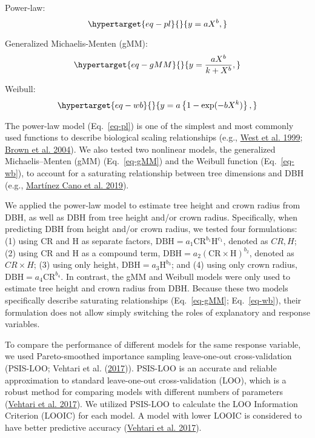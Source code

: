 \documentclass[
  12pt,
  letterpaper,
  DIV=11,
  numbers=noendperiod]{scrartcl}
\begin{document}
Power-law: \begin{equation}\protect\hypertarget{eq-pl}{}{
y = aX^b,
}\label{eq-pl}\end{equation}

Generalized Michaelis-Menten (gMM):
\begin{equation}\protect\hypertarget{eq-gMM}{}{
y = \frac{aX^b}{k + X^b},
}\label{eq-gMM}\end{equation}

Weibull: \begin{equation}\protect\hypertarget{eq-wb}{}{
y = a\left\{1-\mathrm{exp}(-bX^k)\right\},
}\label{eq-wb}\end{equation}

The power-law model (Eq.~\ref{eq-pl}) is one of the simplest and most
commonly used functions to describe biological scaling relationships
(e.g., \protect\hyperlink{ref-West1999}{West et al. 1999};
\protect\hyperlink{ref-Brown2004}{Brown et al. 2004}). We also tested
two nonlinear models, the generalized Michaelis--Menten (gMM)
(Eq.~\ref{eq-gMM}) and the Weibull function (Eq.~\ref{eq-wb}), to
account for a saturating relationship between tree dimensions and DBH
(e.g., \protect\hyperlink{ref-MartinezCano2019}{Martínez Cano et al.
2019}).

We applied the power-law model to estimate tree height and crown radius
from DBH, as well as DBH from tree height and/or crown radius.
Specifically, when predicting DBH from height and/or crown radius, we
tested four formulations: (1) using CR and H as separate factors,
\(\mathrm{DBH} = a_1 \mathrm{CR}^{b_1} \mathrm{H}^{c_1}\), denoted as
\(CR,H\); (2) using CR and H as a compound term,
\(\mathrm{DBH} = a_2 (\mathrm{CR} \times \mathrm{H})^{b_2}\), denoted as
\(CR \times H\); (3) using only height,
\(\mathrm{DBH} = a_3 \mathrm{H}^{b_3}\); and (4) using only crown
radius, \(\mathrm{DBH} = a_4 \mathrm{CR}^{b_4}\). In contrast, the gMM
and Weibull models were only used to estimate tree height and crown
radius from DBH. Because these two models specifically describe
saturating relationships (Eq.~\ref{eq-gMM}; Eq.~\ref{eq-wb}), their
formulation does not allow simply switching the roles of explanatory and
response variables.

To compare the performance of different models for the same response
variable, we used Pareto-smoothed importance sampling leave-one-out
cross-validation (PSIS-LOO; Vehtari et al.
(\protect\hyperlink{ref-Vehtari2017}{2017})). PSIS-LOO is an accurate
and reliable approximation to standard leave-one-out cross-validation
(LOO), which is a robust method for comparing models with different
numbers of parameters (\protect\hyperlink{ref-Vehtari2017}{Vehtari et
al. 2017}). We utilized PSIS-LOO to calculate the LOO Information
Criterion (LOOIC) for each model. A model with lower LOOIC is considered
to have better predictive accuracy
(\protect\hyperlink{ref-Vehtari2017}{Vehtari et al. 2017}).
\end{document}
